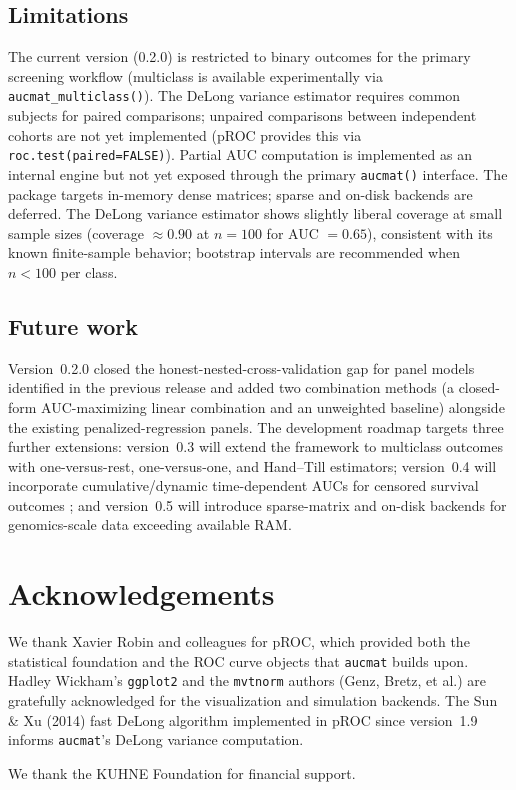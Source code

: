 \documentclass[11pt,a4paper]{article}
\begin{document}
\subsection{Limitations}

The current version (0.2.0) is restricted to binary outcomes for the primary
screening workflow (multiclass is available experimentally via
\texttt{aucmat\_multiclass()}).  The DeLong variance estimator requires
common subjects for paired comparisons; unpaired comparisons between
independent cohorts are not yet implemented (pROC provides this via
\texttt{roc.test(paired=FALSE)}).  Partial AUC computation is implemented as
an internal engine but not yet exposed through the primary
\texttt{aucmat()} interface.  The package targets in-memory dense matrices;
sparse and on-disk backends are deferred.  The DeLong variance estimator
shows slightly liberal coverage at small sample sizes (coverage
$\approx 0.90$ at $n = 100$ for AUC $= 0.65$), consistent with its known
finite-sample behavior; bootstrap intervals are recommended when
$n < 100$ per class.

\subsection{Future work}

Version~0.2.0 closed the honest-nested-cross-validation gap for panel models
identified in the previous release and added two combination methods (a
closed-form AUC-maximizing linear combination and an unweighted baseline)
alongside the existing penalized-regression panels.  The development roadmap
targets three further extensions: version~0.3 will extend the framework to
multiclass outcomes with one-versus-rest, one-versus-one, and Hand--Till
estimators; version~0.4 will incorporate cumulative/dynamic time-dependent
AUCs for censored survival outcomes \citep{Heagerty2000,Blanche2013}; and
version~0.5 will introduce sparse-matrix and on-disk backends for
genomics-scale data exceeding available RAM.

\section*{Acknowledgements}

We thank Xavier Robin and colleagues for pROC, which provided both the
statistical foundation and the ROC curve objects that \texttt{aucmat} builds
upon.  Hadley Wickham's \texttt{ggplot2} and the \texttt{mvtnorm} authors
(Genz, Bretz, et al.) are gratefully acknowledged for the visualization and
simulation backends.  The Sun \& Xu (2014) fast DeLong algorithm implemented
in pROC since version~1.9 informs \texttt{aucmat}'s DeLong variance
computation.

We thank the KUHNE Foundation for financial support.



\end{document}
